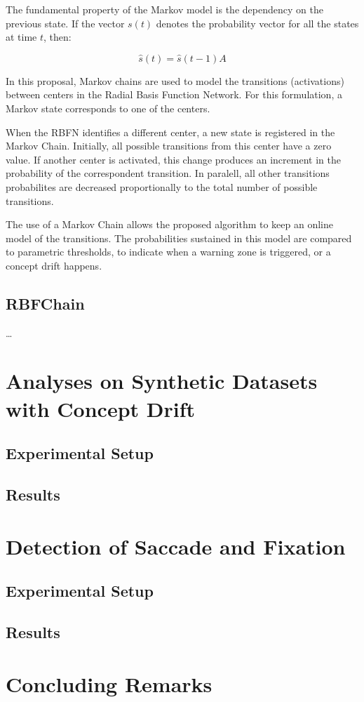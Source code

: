 \documentclass[preprint,12pt]{elsarticle}
\begin{document}
The fundamental property of the Markov model is the dependency on the previous state. If the vector $s(t)$ denotes the probability vector for all the states at time $t$, then:

\begin{equation}
    \label{eq:markov}
    \hat { s } ( t ) = \hat { s } ( t - 1 ) A
\end{equation}

In this proposal, Markov chains are used to model the transitions (activations) between centers in the Radial Basis Function Network.
For this formulation, a Markov state corresponds to one of the centers.

When the RBFN identifies a different center, a new state is registered in the Markov Chain.
Initially, all possible transitions from this center have a zero value.
If another center is activated, this change produces an increment in the probability of the correspondent transition.
In paralell, all other transitions probabilites are decreased proportionally to the total number of possible transitions.

The use of a Markov Chain allows the proposed algorithm to keep an online model of the transitions. The probabilities sustained in this model are compared to parametric thresholds, to indicate when a warning zone is triggered, or a concept drift happens.

\subsection{RBFChain}

\ldots

\section{Analyses on Synthetic Datasets with Concept Drift}
\label{sec:results_synthetic_dataset}

\subsection{Experimental Setup}

\subsection{Results}

\section{Detection of Saccade and Fixation}
\label{sec:detection_of_saccade_and_fixation}

\subsection{Experimental Setup}

\subsection{Results}

\section{Concluding Remarks}



\end{document}
